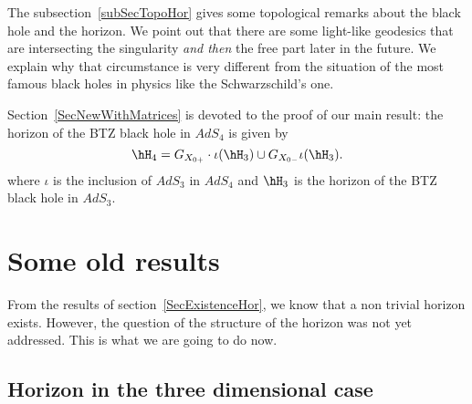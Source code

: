 The subsection~\ref{subSecTopoHor} gives some topological remarks about the black hole and the horizon. We point out that there are some light-like geodesics that are intersecting the singularity \emph{and then} the free part later in the future. We explain why that circumstance is very different from the situation of the most famous black holes in physics like the Schwarzschild's one.

Section~\ref{SecNewWithMatrices} is devoted to the proof of our main result: the horizon of the BTZ black hole in $AdS_4$ is given by
\begin{equation}
	\hH_4=G_{X_{0+}}\cdot \iota(\hH_3)\cup G_{X_{0-}}\iota(\hH_3).
\end{equation}
where $\iota$ is the inclusion of $AdS_3$ in $AdS_4$ and $\hH_3$ is the horizon of the BTZ black hole in $AdS_3$.

\section{Some old results}
\label{SecOldResults}

From the results of section~\ref{SecExistenceHor}, we know that a non trivial horizon exists. However, the question of the structure of the horizon was not yet addressed. This is what we are going to do now.

\subsection{Horizon in the three dimensional case}
\label{SubSecHorInThreeDimensionOld}

